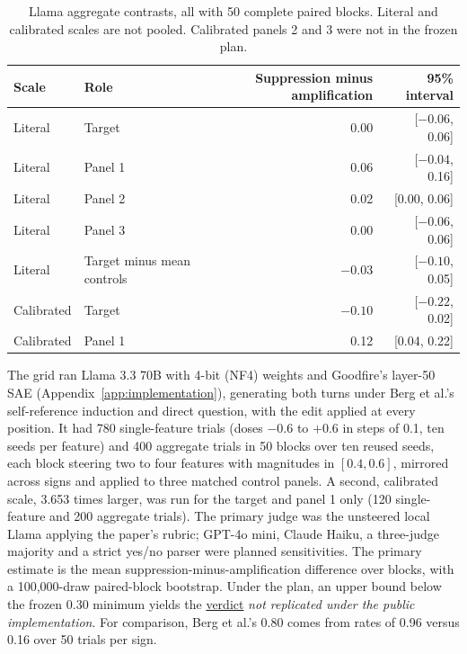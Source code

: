 \documentclass[11pt]{article}
\newcommand{\artifact}[2]{\href{https://github.com/tdj28/llm_selfref_pre/blob/f5e906e1737bc71bf20b642af1d698018eec82fe/#1}{#2}}
\begin{document}
\begin{table}[htbp]
\centering\small
\caption{Llama aggregate contrasts, all with 50 complete paired blocks.
Literal and calibrated scales are not pooled. Calibrated panels 2 and 3 were
not in the frozen plan.}
\label{tab:scales}
\begin{tabular}{@{}llrr@{}}
\toprule
Scale & Role & Suppression minus amplification & 95\% interval\\
\midrule
Literal & Target & 0.00 & [$-0.06$, 0.06]\\
Literal & Panel 1 & 0.06 & [$-0.04$, 0.16]\\
Literal & Panel 2 & 0.02 & [0.00, 0.06]\\
Literal & Panel 3 & 0.00 & [$-0.06$, 0.06]\\
Literal & Target minus mean controls & $-0.03$ & [$-0.10$, 0.05]\\
\midrule
Calibrated & Target & $-0.10$ & [$-0.22$, 0.02]\\
Calibrated & Panel 1 & 0.12 & [0.04, 0.22]\\
\bottomrule
\end{tabular}
\end{table}

The grid ran Llama 3.3 70B with 4-bit (NF4) weights and Goodfire's layer-50
SAE (Appendix~\ref{app:implementation}), generating both turns under Berg et
al.'s self-reference induction and direct question, with the edit applied at
every position. It had 780 single-feature trials (doses $-0.6$ to $+0.6$ in
steps of 0.1, ten seeds per feature) and 400 aggregate trials in 50 blocks
over ten reused seeds, each block steering two to four features with
magnitudes in $[0.4,0.6]$, mirrored across signs and applied to three matched
control panels. A second, calibrated scale, 3.653 times larger, was run for
the target and panel 1 only (120 single-feature and 200 aggregate trials).
The primary judge was the unsteered local Llama applying the paper's rubric;
GPT-4o mini, Claude Haiku, a three-judge majority and a strict yes/no parser
were planned sensitivities. The primary estimate is the mean
suppression-minus-amplification difference over blocks, with a
100,000-draw paired-block bootstrap. Under the plan, an upper bound below the
frozen 0.30 minimum yields the
\artifact{data/public_sae_consciousness_gating/confirmatory_v1_20260710/analysis/primary_verdict.json}{verdict}
\emph{not replicated under the public implementation}. For comparison, Berg
et al.'s 0.80 comes from rates of 0.96 versus 0.16 over 50 trials per sign.
\end{document}
